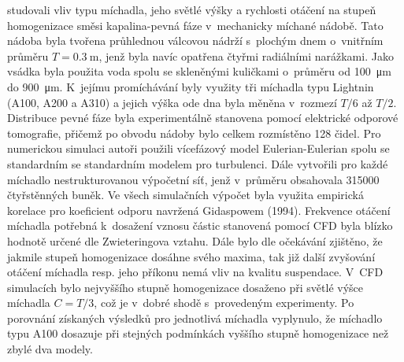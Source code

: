 \citet{hos10} studovali vliv typu míchadla, jeho světlé výšky a rychlosti otáčení na stupeň homogenizace směsi kapalina-pevná fáze v~mechanicky míchané nádobě. Tato nádoba byla tvořena průhlednou válcovou nádrží s~plochým dnem o~vnitřním průměru $T=\SI{0.3}{\meter}$, jenž byla navíc opatřena čtyřmi radiálními narážkami. Jako vsádka byla použita voda spolu se skleněnými kuličkami o~průměru od \SI{100}{\micro\meter} do \SI{900}{\micro\meter}. K~jejímu promíchávání byly využity tři míchadla typu Lightnin (A100, A200 a A310) a jejich výška ode dna byla měněna v~rozmezí $T/6$ až $T/2$. Distribuce pevné fáze byla experimentálně stanovena pomocí elektrické odporové tomografie, přičemž po obvodu nádoby bylo celkem rozmístěno \num{128} čidel. Pro numerickou simulaci autoři použili vícefázový model Eulerian-Eulerian spolu se standardním se standardním \keps{} modelem pro turbulenci. Dále vytvořili pro každé míchadlo nestrukturovanou výpočetní síť, jenž v~průměru obsahovala \num{315000} čtyřstěnných buněk. Ve všech simulačních výpočet byla využita empirická korelace pro koeficient odporu navržená Gidaspowem (1994). Frekvence otáčení míchadla potřebná k~dosažení vznosu částic stanovená pomocí CFD byla blízko hodnotě určené dle Zwieteringova vztahu. Dále bylo dle očekávání  zjištěno, že jakmile stupeň homogenizace dosáhne svého maxima, tak již další zvyšování otáčení míchadla resp. jeho příkonu nemá vliv na kvalitu suspendace. V~CFD simulacích bylo nejvyššího stupně homogenizace dosaženo při světlé výšce míchadla $C=T/3$, což je v~dobré shodě s~provedeným experimenty. Po porovnání získaných výsledků pro jednotlivá míchadla vyplynulo, že míchadlo typu A100 dosazuje při stejných podmínkách vyššího stupně homogenizace než zbylé dva modely.

